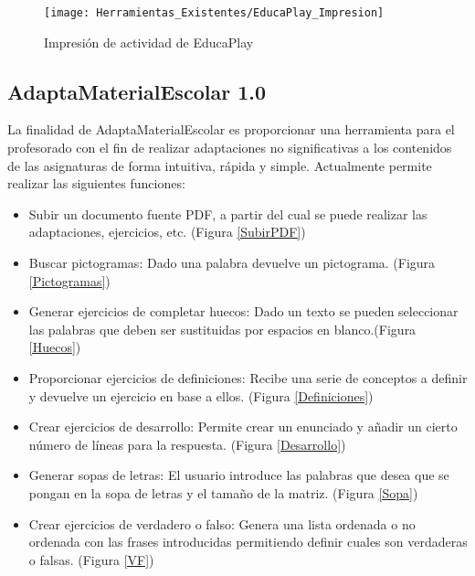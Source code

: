 \begin{figure}[h!]
    \centering
    \texttt{[image: Herramientas\_Existentes/EducaPlay\_Impresion]}
    \caption{Impresión de actividad de EducaPlay}
    \label{fig:EducaPlay_Impresion}
\end{figure}

\subsection{AdaptaMaterialEscolar 1.0}
\label{cap:adaptaMaterial}
La finalidad de AdaptaMaterialEscolar es proporcionar una herramienta para el profesorado con el fin de realizar adaptaciones no significativas a los contenidos de las asignaturas de forma intuitiva, rápida y simple. Actualmente permite realizar las siguientes funciones:
\begin{itemize}
    \item Subir un documento fuente PDF, a partir del cual se puede realizar las adaptaciones, ejercicios, etc. (Figura \ref{SubirPDF})
    \item Buscar pictogramas: Dado una palabra devuelve un pictograma. (Figura \ref{Pictogramas})
    \item Generar ejercicios de completar huecos: Dado un texto se pueden seleccionar las palabras que deben ser sustituidas por espacios en blanco.(Figura \ref{Huecos})
    \item Proporcionar ejercicios de definiciones: Recibe una serie de conceptos a definir y devuelve un ejercicio en base a ellos. (Figura \ref{Definiciones})
    \item Crear ejercicios de desarrollo: Permite crear un enunciado y añadir un cierto número de líneas para la respuesta. (Figura \ref{Desarrollo})
    \item Generar sopas de letras: El usuario introduce las palabras que desea que se pongan en la sopa de letras y el tamaño de la matriz. (Figura \ref{Sopa})
    \item Crear ejercicios de verdadero o falso: Genera una lista ordenada o no ordenada con las frases introducidas permitiendo definir cuales son verdaderas o falsas. (Figura \ref{VF})
\end{itemize}

